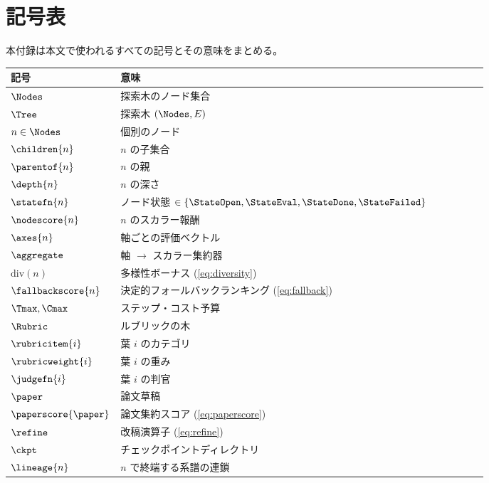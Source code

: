 \section{記号表}\label{sec:notation}

本付録は本文で使われるすべての記号とその意味をまとめる。

\begin{longtable}{@{}l p{0.78\linewidth}@{}}
  \toprule
  記号 & 意味 \\
  \midrule
  $\Nodes$            & 探索木のノード集合 \\
  $\Tree$             & 探索木 $(\Nodes, E)$ \\
  $n\in\Nodes$        & 個別のノード \\
  $\children{n}$      & $n$ の子集合 \\
  $\parentof{n}$      & $n$ の親 \\
  $\depth{n}$         & $n$ の深さ \\
  $\statefn{n}$       & ノード状態 $\in\{\StateOpen,\StateEval,\StateDone,\StateFailed\}$ \\
  $\nodescore{n}$     & $n$ のスカラー報酬 \\
  $\axes{n}$          & 軸ごとの評価ベクトル \\
  $\aggregate$        & 軸 $\to$ スカラー集約器 \\
  $\mathrm{div}(n)$   & 多様性ボーナス (\cref{eq:diversity}) \\
  $\fallbackscore{n}$ & 決定的フォールバックランキング (\cref{eq:fallback}) \\
  $\Tmax,\Cmax$       & ステップ・コスト予算 \\
  $\Rubric$           & ルブリックの木 \\
  $\rubricitem{i}$    & 葉 $i$ のカテゴリ \\
  $\rubricweight{i}$  & 葉 $i$ の重み \\
  $\judgefn{i}$       & 葉 $i$ の判官 \\
  $\paper$            & 論文草稿 \\
  $\paperscore{\paper}$ & 論文集約スコア (\cref{eq:paperscore}) \\
  $\refine$           & 改稿演算子 (\cref{eq:refine}) \\
  $\ckpt$             & チェックポイントディレクトリ \\
  $\lineage{n}$       & $n$ で終端する系譜の連鎖 \\
  \bottomrule
\end{longtable}
